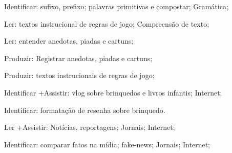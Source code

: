  Identificar: sufixo, prefixo; palavras primitivas e compostar; Gramática;

 Ler: textos instrucional de regras de jogo; Compreensão de texto;

 Ler: entender anedotas, piadas e cartuns;

 Produzir: Registrar anedotas, piadas e cartuns;

 Produzir: textos instrucionais de regras de jogo;

 Identificar +Assistir:  vlog sobre brinquedos e livros infantis; Internet;

 Identificar: formatação de resenha sobre brinquedo. 

 Ler +Assistir: Notícias, reportagens; Jornais; Internet;

 Identificar: comparar fatos na mídia; fake-news; Jornais; Internet;

